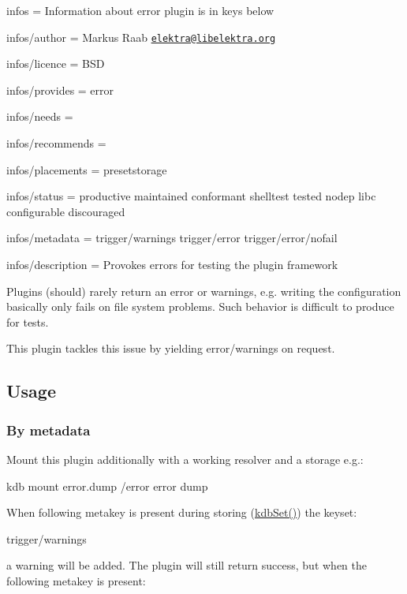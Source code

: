
\begin{DoxyItemize}
\item infos = Information about error plugin is in keys below
\item infos/author = Markus Raab \href{mailto:elektra@libelektra.org}{\tt elektra@libelektra.\+org}
\item infos/licence = B\+SD
\item infos/provides = error
\item infos/needs =
\item infos/recommends =
\item infos/placements = presetstorage
\item infos/status = productive maintained conformant shelltest tested nodep libc configurable discouraged
\item infos/metadata = trigger/warnings trigger/error trigger/error/nofail
\item infos/description = Provokes errors for testing the plugin framework
\end{DoxyItemize}

Plugins (should) rarely return an error or warnings, e.\+g. writing the configuration basically only fails on file system problems. Such behavior is difficult to produce for tests.

This plugin tackles this issue by yielding error/warnings on request.

\subsection*{Usage}

\subsubsection*{By metadata}

Mount this plugin additionally with a working resolver and a storage e.\+g.\+:


\begin{DoxyCode}
kdb mount error.dump /error error dump
\end{DoxyCode}


When following metakey is present during storing ({\ttfamily \hyperlink{group__kdb_ga11436b058408f83d303ca5e996832bcf}{kdb\+Set()}}) the keyset\+:


\begin{DoxyCode}
trigger/warnings
\end{DoxyCode}


a warning will be added. The plugin will still return success, but when the following metakey is present\+:


